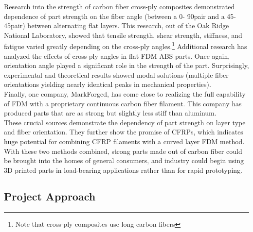 Research into the strength of carbon fiber cross-ply composites demonstrated dependence of part strength on the fiber angle (between a 0\degree - 90\degree pair and a 45\degree - 45\degree pair) between alternating flat layers. This research, out of the Oak Ridge National Laboratory, showed that tensile strength, shear strength, stiffness, and fatigue varied greatly depending on the cross-ply angles.\footnote{Note that cross-ply composites use long carbon fibers}\cite{ornl} Additional research has analyzed the effects of cross-ply angles \cite{cantilever} in flat FDM ABS parts. Once again, orientation angle played a significant role in the strength of the part. Surprisingly, experimental and theoretical results showed modal solutions (multiple fiber orientations yielding nearly identical peaks in mechanical properties).\\

Finally, one company, MarkForged\cite{markforged}, has come close to realizing the full capability of FDM with a proprietary continuous carbon fiber filament. This company has produced parts that are as strong but slightly less stiff than aluminum.\\

These crucial sources demonstrate the dependency of part strength on layer type and fiber orientation. They further show the promise of CFRPs, which indicates huge potential for combining CFRP filaments with a curved layer FDM method. With these two methods combined, strong parts made out of carbon fiber could be brought into the homes of general consumers, and industry could begin using 3D printed parts in load-bearing applications rather than for rapid prototyping.\\

\subsection{Project Approach}

\indent

